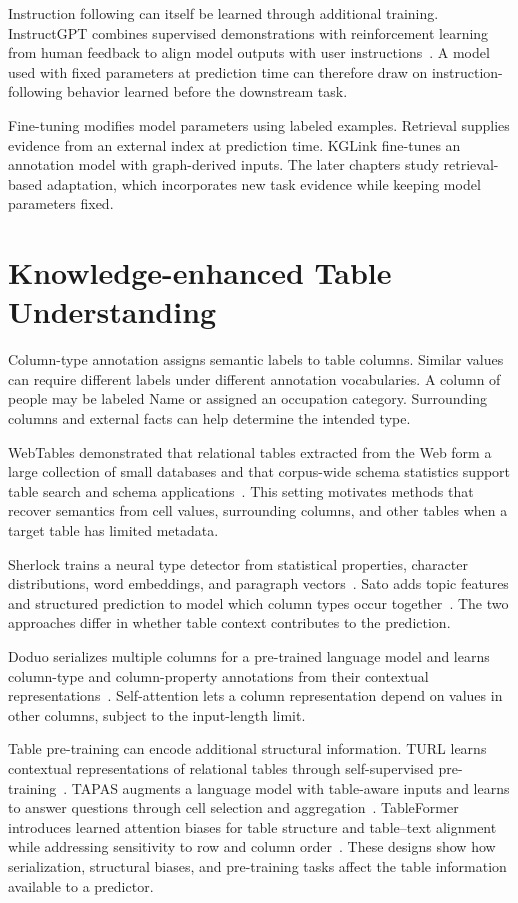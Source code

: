 Instruction following can itself be learned through additional training. InstructGPT combines supervised demonstrations with reinforcement learning from human feedback to align model outputs with user instructions~\cite{lit-ouyang2022training}. A model used with fixed parameters at prediction time can therefore draw on instruction-following behavior learned before the downstream task.

Fine-tuning modifies model parameters using labeled examples. Retrieval supplies evidence from an external index at prediction time. KGLink fine-tunes an annotation model with graph-derived inputs. The later chapters study retrieval-based adaptation, which incorporates new task evidence while keeping model parameters fixed.

\section{Knowledge-enhanced Table Understanding}
\label{sec:background:tables}

Column-type annotation assigns semantic labels to table columns. Similar values can require different labels under different annotation vocabularies. A column of people may be labeled Name or assigned an occupation category. Surrounding columns and external facts can help determine the intended type.

WebTables demonstrated that relational tables extracted from the Web form a large collection of small databases and that corpus-wide schema statistics support table search and schema applications~\cite{lit-cafarella2008webtables}. This setting motivates methods that recover semantics from cell values, surrounding columns, and other tables when a target table has limited metadata.

Sherlock trains a neural type detector from statistical properties, character distributions, word embeddings, and paragraph vectors~\cite{bg-sherlock}. Sato adds topic features and structured prediction to model which column types occur together~\cite{bg-sato}. The two approaches differ in whether table context contributes to the prediction.

Doduo serializes multiple columns for a pre-trained language model and learns column-type and column-property annotations from their contextual representations~\cite{bg-doduo}. Self-attention lets a column representation depend on values in other columns, subject to the input-length limit.

Table pre-training can encode additional structural information. TURL learns contextual representations of relational tables through self-supervised pre-training~\cite{lit-deng2022turl}. TAPAS augments a language model with table-aware inputs and learns to answer questions through cell selection and aggregation~\cite{lit-herzig2020tapas}. TableFormer introduces learned attention biases for table structure and table--text alignment while addressing sensitivity to row and column order~\cite{lit-yang2022tableformer}. These designs show how serialization, structural biases, and pre-training tasks affect the table information available to a predictor.

